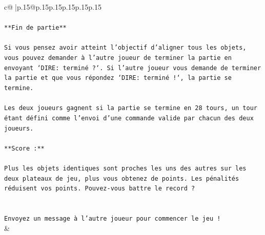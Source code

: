 \documentclass{article}
\begin{document}
{\begin{supertabular}{c@{$\;$}|p{.15\linewidth}@{}p{.15\linewidth}p{.15\linewidth}p{.15\linewidth}p{.15\linewidth}p{.15\linewidth}}
{{{\\ 
\\ 
\texttt{**Fin de partie**} \\
\\ 
\texttt{Si vous pensez avoir atteint l'objectif d'aligner tous les objets, vous pouvez demander à l'autre joueur de terminer la partie en envoyant `DIRE: terminé ?`. Si l'autre joueur vous demande de terminer la partie et que vous répondez `DIRE: terminé !`, la partie se termine.} \\
\\ 
\texttt{Les deux joueurs gagnent si la partie se termine en 28 tours, un tour étant défini comme l'envoi d'une commande valide par chacun des deux joueurs.} \\
\\ 
\texttt{**Score :**} \\
\\ 
\texttt{Plus les objets identiques sont proches les uns des autres sur les deux plateaux de jeu, plus vous obtenez de points. Les pénalités réduisent vos points. Pouvez{-}vous battre le record ?} \\
\\ 
\\ 
\texttt{Envoyez un message à l'autre joueur pour commencer le jeu !} \\
            }
        }
    }
    & \\ \\


\end{supertabular}}
\end{document}
